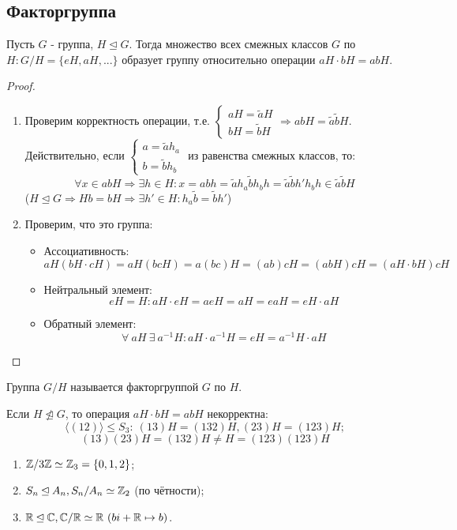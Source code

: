 \subsection{Факторгруппа}
\begin{subtheorem}
    Пусть $G$ - группа, $H\unlhd G$. Тогда множество всех смежных классов $G$ по $H : G/H = \{eH, aH, ...\}$ образует группу относительно операции $aH \cdot bH = abH$.
\end{subtheorem}
\begin{proof}\tab
    \begin{enumerate}
        \item Проверим корректность операции, т.е. $\begin{cases}
            aH = \tilde{a}H\\
            bH = \tilde{b}H
        \end{cases} \Longrightarrow abH = \tilde{a}\tilde{b}H$.\\
        Действительно, если $\begin{cases}
            a = \tilde{a}h_a\\
            b = \tilde{b}h_b
        \end{cases}$ из равенства смежных классов, то:
        \[\forall x \in abH \Longrightarrow \exists h\in H: x = abh = \tilde{a}h_a\tilde{b}h_bh = \tilde{a}\tilde{b}h'h_bh \in \tilde{a}\tilde{b}H\]
        ($H \unlhd G \Longrightarrow Hb = bH \Longrightarrow \exists h' \in H: h_a\tilde{b} = \tilde{b}h'$)
        \item Проверим, что это группа:
        \begin{itemize}
            \item Ассоциативность:
            \[aH(bH\cdot cH) = aH(bcH) = a(bc)H = (ab)cH = (abH)cH = (aH\cdot bH)cH\]
            \item Нейтральный элемент:
            \[eH = H: aH \cdot eH = aeH = aH = eaH = eH\cdot aH\]
            \item Обратный элемент:
            \[\forall \ aH \ \exists \ a^{-1}H: aH \cdot a^{-1}H = eH = a^{-1}H \cdot aH\]
        \end{itemize}
    \end{enumerate}
\end{proof}
\begin{definition}
    Группа $G/H$ называется факторгруппой $G$ по $H$.
\end{definition}
\begin{remark}
    Если $H \ntrianglelefteq G$, то операция $aH\cdot bH = abH$ некорректна:
    \[\langle(12)\rangle \leq S_3: \ (13)H = (132)H, (23)H = (123)H;\]
    \[(13)(23)H = (132)H \neq H = (123)(123)H\]
\end{remark}
\begin{examples}\tab
    \begin{enumerate}
        \item $\mathbb{Z} / 3\mathbb{Z} \simeq \mathbb{Z}_3 = \{0, 1, 2\}$;
        \item $S_n \unlhd A_n, S_n/A_n \simeq \mathbb{Z}_2$ (по чётности);
        \item $\R \unlhd \CC, \CC / \R \simeq \R \ (bi + \R \mapsto b)$. 
    \end{enumerate}
\end{examples}

